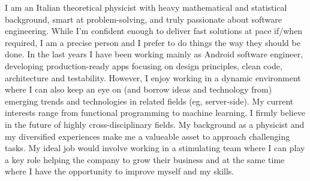 
\begin{cvparagraph}
I am an Italian theoretical physicist with heavy mathematical and statistical 
background, smart at problem-solving, and truly passionate about software engineering. 
While 
I'm confident enough to
deliver 
fast solutions at pace
if/when
required, 
I am a precise person and I prefer to do things the way they
should be done.
In the last years I have been working mainly as Android software engineer,  developing production-ready apps 
	focusing on design principles, clean code, architecture and testability.
 However, I enjoy  working in a dynamic
environment 
 where I can also keep an eye on (and borrow ideas and technology from) emerging trends and technologies in related
	fields (eg, server-side).
	My current interests range from functional programming to machine learning. 
 I firmly
believe in the future of highly cross-disciplinary fields.
My background as a physicist and my diversified experiences make me a valueable asset to approach challenging tasks. 
My ideal job would involve working in a stimulating team where I
can play a key role helping the company to grow their business and at the same time
where I have the opportunity to improve myself and my skills.
\end{cvparagraph}
